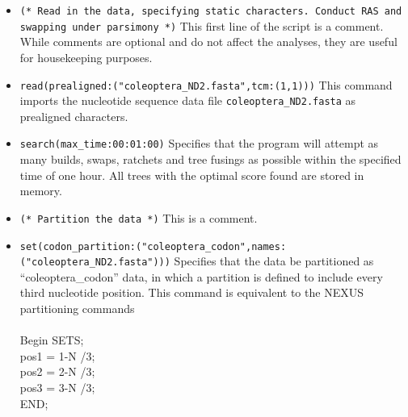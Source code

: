 \begin{itemize}
\item \texttt{(* Read in the data, specifying static characters.  Conduct RAS and swapping under parsimony *)} 
This first line of the script is a comment. While comments are optional and do not affect the analyses, they are 
useful for housekeeping purposes.
\item \texttt{read(prealigned:("coleoptera\_ND2.fasta",tcm:(1,1)))} This command imports the nucleotide sequence 
data file \texttt{coleoptera\_ND2.fasta} as prealigned characters. 
\item \texttt{search(max\_time:00:01:00)} Specifies that the program will attempt as many builds, swaps, ratchets 
and tree fusings as possible within the specified time of one hour. All trees with the optimal score found are stored 
in memory.
\item \texttt{(* Partition the data *)} This is a comment.
\item \texttt{set(codon\_partition:("coleoptera\_codon",names:("coleoptera\_ND2.fasta")))} Specifies that the data be 
partitioned as ``coleoptera\_codon'' data, in which a partition is defined to include every third nucleotide position. 
This command is equivalent to the NEXUS partitioning commands
\\
\\
Begin SETS;\\
pos1 = 1-N /3;\\
pos2 = 2-N /3;\\
pos3 = 3-N /3;\\
END;\\


\end{itemize}
